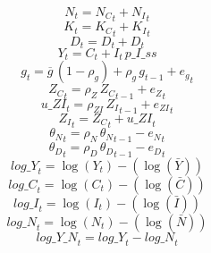 \begin{dmath}
{{N}}_{t}={{N_C}}_{t}+{{N_I}}_{t}
\end{dmath}
\begin{dmath}
{{K}}_{t}={{K_C}}_{t}+{{K_I}}_{t}
\end{dmath}
\begin{dmath}
{{D}}_{t}={{D}}_{t}+{{D}}_{t}
\end{dmath}
\begin{dmath}
{{Y}}_{t}={{C}}_{t}+{{I}}_{t}\, {p\_I\_ss}
\end{dmath}
\begin{dmath}
{{g}}_{t}={{\overline{g}}}\, \left(1-{{\rho_g}}\right)+{{\rho_g}}\, {{g}}_{t-1}+{{e_g}}_{t}
\end{dmath}
\begin{dmath}
{{Z_C}}_{t}={{\rho_Z}}\, {{Z_C}}_{t-1}+{{e_Z}}_{t}
\end{dmath}
\begin{dmath}
{u\_ZI}_{t}={{\rho_{ZI}}}\, {{Z_I}}_{t-1}+{{e_{ZI}}}_{t}
\end{dmath}
\begin{dmath}
{{Z_I}}_{t}={{Z_C}}_{t}+{u\_ZI}_{t}
\end{dmath}
\begin{dmath}
{{\theta_N}}_{t}={{\rho_N}}\, {{\theta_N}}_{t-1}-{{e_N}}_{t}
\end{dmath}
\begin{dmath}
{{\theta_D}}_{t}={{\rho_D}}\, {{\theta_D}}_{t-1}-{{e_D}}_{t}
\end{dmath}
\begin{dmath}
{log\_Y}_{t}=\log\left({{Y}}_{t}\right)-(\log\left(\bar{{Y}}\right))
\end{dmath}
\begin{dmath}
{log\_C}_{t}=\log\left({{C}}_{t}\right)-(\log\left(\bar{{C}}\right))
\end{dmath}
\begin{dmath}
{log\_I}_{t}=\log\left({{I}}_{t}\right)-(\log\left(\bar{{I}}\right))
\end{dmath}
\begin{dmath}
{log\_N}_{t}=\log\left({{N}}_{t}\right)-(\log\left(\bar{{N}}\right))
\end{dmath}
\begin{dmath}
{log\_Y\_N}_{t}={log\_Y}_{t}-{log\_N}_{t}
\end{dmath}
